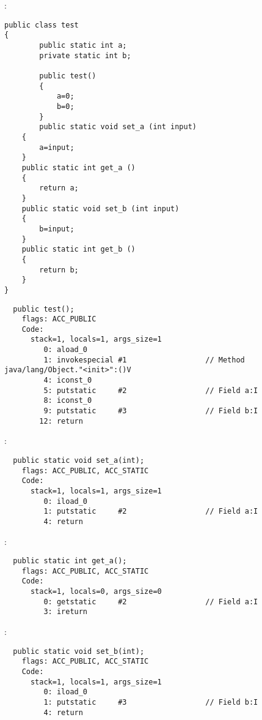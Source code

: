\section{}

:

\begin{lstlisting}[caption=test.java]
public class test
{
        public static int a;
        private static int b;

        public test()
        {
            a=0;
            b=0;
        }
        public static void set_a (int input)
	{
		a=input;
	}
	public static int get_a ()
	{
		return a;
	}
	public static void set_b (int input)
	{
		b=input;
	}
	public static int get_b ()
	{
		return b;
	}
}
\end{lstlisting}


\begin{lstlisting}
  public test();
    flags: ACC_PUBLIC
    Code:
      stack=1, locals=1, args_size=1
         0: aload_0       
         1: invokespecial #1                  // Method java/lang/Object."<init>":()V
         4: iconst_0      
         5: putstatic     #2                  // Field a:I
         8: iconst_0      
         9: putstatic     #3                  // Field b:I
        12: return        
\end{lstlisting}
        
 :

\begin{lstlisting}
  public static void set_a(int);
    flags: ACC_PUBLIC, ACC_STATIC
    Code:
      stack=1, locals=1, args_size=1
         0: iload_0       
         1: putstatic     #2                  // Field a:I
         4: return        
\end{lstlisting}

 :

\begin{lstlisting}
  public static int get_a();
    flags: ACC_PUBLIC, ACC_STATIC
    Code:
      stack=1, locals=0, args_size=0
         0: getstatic     #2                  // Field a:I
         3: ireturn       
\end{lstlisting}

 :

\begin{lstlisting}
  public static void set_b(int);
    flags: ACC_PUBLIC, ACC_STATIC
    Code:
      stack=1, locals=1, args_size=1
         0: iload_0       
         1: putstatic     #3                  // Field b:I
         4: return        
\end{lstlisting}

